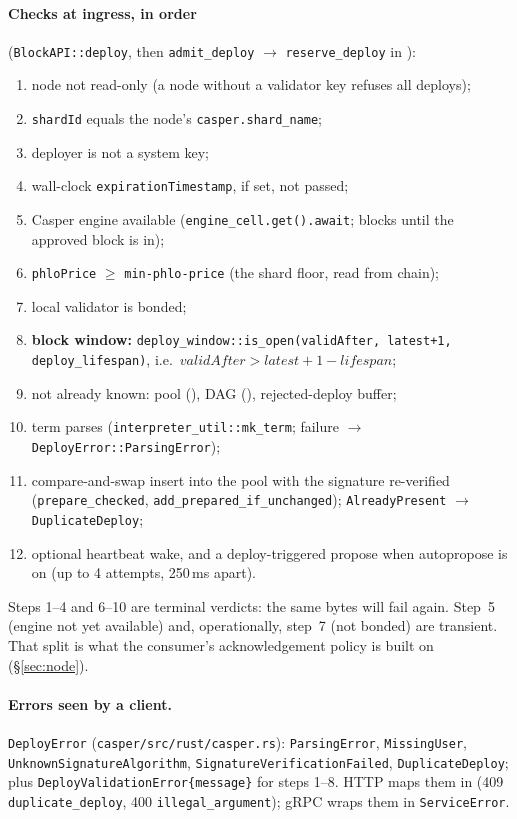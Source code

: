 \documentclass[11pt]{article}
\newcommand{\code}[1]{\texttt{#1}}
\begin{document}
\paragraph{Checks at ingress, in order} (\code{BlockAPI::deploy}, then
\code{admit\_deploy} $\to$ \code{reserve\_deploy} in
):
\begin{enumerate}[leftmargin=2em]
  \item node not read-only (a node without a validator key refuses all deploys);
  \item \code{shardId} equals the node's \code{casper.shard\_name};
  \item deployer is not a system key;
  \item wall-clock \code{expirationTimestamp}, if set, not passed;
  \item Casper engine available (\code{engine\_cell.get().await}; blocks until the
    approved block is in);
  \item \code{phloPrice} $\ge$ \code{min-phlo-price} (the shard floor, read from chain);
  \item local validator is bonded;
  \item \textbf{block window:} \code{deploy\_window::is\_open(validAfter, latest+1,
    deploy\_lifespan)}, i.e.\ $\mathit{validAfter} > \mathit{latest} + 1 - \mathit{lifespan}$;
  \item not already known: pool (), DAG
    (), rejected-deploy buffer;
  \item term parses (\code{interpreter\_util::mk\_term}; failure $\to$
    \code{DeployError::ParsingError});
  \item compare-and-swap insert into the pool with the signature re-verified
    (\code{prepare\_checked}, \code{add\_prepared\_if\_unchanged});
    \code{AlreadyPresent} $\to$ \code{DuplicateDeploy};
  \item optional heartbeat wake, and a deploy-triggered propose when autopropose is
    on (up to 4 attempts, 250\,ms apart).
\end{enumerate}
Steps 1--4 and 6--10 are terminal verdicts: the same bytes will fail again. Step~5
(engine not yet available) and, operationally, step~7 (not bonded) are transient.
That split is what the consumer's acknowledgement policy is built on
(\S\ref{sec:node}).

\paragraph{Errors seen by a client.} \code{DeployError} (\code{casper/src/rust/casper.rs}):
\code{ParsingError}, \code{MissingUser}, \code{UnknownSignatureAlgorithm},
\code{SignatureVerificationFailed}, \code{DuplicateDeploy}; plus
\code{DeployValidationError\{message\}} for steps 1--8. HTTP maps them in
 (409 \code{duplicate\_deploy}, 400
\code{illegal\_argument}); gRPC wraps them in \code{ServiceError}.
\end{document}
